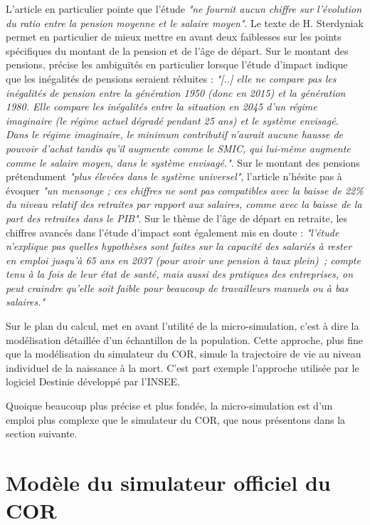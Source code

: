 \documentclass[10pt]{article}
\begin{document}
L'article \cite{Sterdyniak2020} en particulier pointe que l'étude 
\emph{"ne fournit aucun chiffre sur l'évolution du ratio entre la pension 
moyenne et le salaire moyen"}. 
Le texte de H. Sterdyniak permet en particulier de mieux mettre 
en avant deux faiblesses sur les points spécifiques du montant de la pension 
et de l'âge de départ. 
Sur le montant des pensions, \cite{Sterdyniak2020} précise les 
ambiguïtés en particulier lorsque l'étude d'impact indique que 
les inégalités de pensions seraient réduites : 
\emph{"[..] elle ne compare pas les inégalités de pension entre la génération 1950 (donc en 2015) et la génération 1980. Elle compare les inégalités entre la situation en 2045 d’un régime imaginaire (le régime actuel dégradé pendant 25 ans) et le système envisagé. Dans le régime imaginaire, le minimum contributif n’aurait aucune hausse de pouvoir d’achat tandis qu’il augmente comme le SMIC, qui lui-même augmente comme le salaire moyen, dans le système envisagé."}. 
Sur le montant des pensions prétendument \emph{"plus élevées dans le système 
universel"}, l'article n'hésite pas à évoquer \emph{"un mensonge ; ces chiffres ne sont 
pas compatibles avec la baisse de 22\% du niveau relatif des retraites par rapport 
aux salaires, comme avec la baisse de la part des retraites dans le PIB"}.
Sur le thème de l'âge de départ en retraite, les chiffres avancés 
dans l'étude d'impact sont également mis en doute : \emph{"l’étude n’explique pas quelles hypothèses sont faites sur la capacité des salariés à rester en emploi jusqu’à 65 ans en 2037 (pour avoir une pension à taux plein) ; compte tenu à la fois de leur état de santé, mais aussi des pratiques des entreprises, on peut craindre qu’elle soit faible pour beaucoup de travailleurs manuels ou à bas salaires."}

Sur le plan du calcul, \cite{Bozio2020} met en avant l'utilité de la 
micro-simulation, c'est à dire la modélisation détaillée 
d'un échantillon de la population. 
Cette approche, plus fine que la modélisation du simulateur du COR, 
simule la trajectoire de vie au niveau individuel de la naissance à la mort. 
C'est part exemple l'approche utilisée par le logiciel Destinie 
\cite{INSEEDestinie} développé par l'INSEE. 

Quoique beaucoup plus précise et plus fondée, la micro-simulation est d'un 
emploi plus complexe que le simulateur du COR, que nous présentons dans la 
section suivante. 


\section{Modèle du simulateur officiel du COR}
\end{document}
